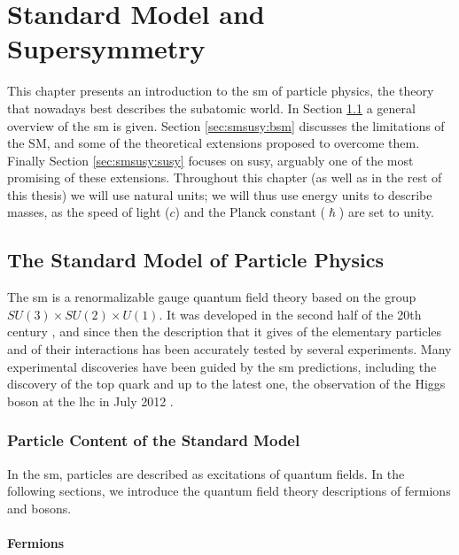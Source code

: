 \chapter{Standard Model and Supersymmetry}
\label{chap:SMSUSY}

This chapter presents an introduction to the \gls{sm} of particle physics, the theory that nowadays best describes the subatomic world. In Section \ref{sec:smsusy:sm} a general overview of the \gls{sm} is given. Section \ref{sec:smsusy:bsm} discusses the limitations of the SM, and some of the theoretical extensions proposed to overcome them. Finally Section \ref{sec:smsusy:susy} focuses on \gls{susy}, arguably one of the most promising of these extensions. Throughout this chapter (as well as in the rest of this thesis) we will use natural units; we will thus use energy units to describe masses, as the speed of light ($c$) and the Planck constant ($\hslash$) are set to unity.


\section{The Standard Model of Particle Physics}
\label{sec:smsusy:sm}

The \gls{sm} is a renormalizable gauge quantum field theory based on the group $SU(3) \times SU(2) \times U(1)$. It was developed in the second half of the 20th century \cite{Glashow:1961tr, Weinberg:1967tq, Salam:1980jd}, and since then the description that it gives of the elementary particles and of their interactions has been accurately tested by several experiments. Many experimental discoveries have been guided by the \gls{sm} predictions, including the discovery of the top quark \cite{Abachi:1994td, PhysRevLett.74.2626} and up to the latest one, the observation of the Higgs boson at the \gls{lhc} in July 2012 \cite{Aad:2012tfa, Chatrchyan:2012xdj}. 

\subsection{Particle Content of the Standard Model}

In the \gls{sm}, particles are described as excitations of quantum fields. In the following sections, we introduce the quantum field theory descriptions of fermions and bosons.

\subsubsection*{Fermions}

